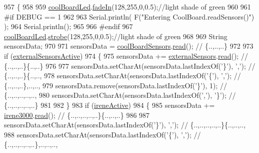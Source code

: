 \begin{DoxyCode}
957 \{
958 
959     \hyperlink{classCoolBoard_a1b1d3c684a5baa56b08486e192fd8e97}{coolBoardLed}.\hyperlink{classCoolBoardLed_ab778f5e7bed0ab74e3906d82110493c3}{fadeIn}(128,255,0,0.5);\textcolor{comment}{//light shade of green}
960                 
961 \textcolor{preprocessor}{#if DEBUG == 1}
962 
963     Serial.println( F(\textcolor{stringliteral}{"Entering CoolBoard.readSensors()"}) );
964     Serial.println();
965 
966 \textcolor{preprocessor}{#endif}
967     \hyperlink{classCoolBoard_a1b1d3c684a5baa56b08486e192fd8e97}{coolBoardLed}.\hyperlink{classCoolBoardLed_ad5f0de4c628cbfbf49896042831c64ad}{strobe}(128,255,0,0.5);\textcolor{comment}{//light shade of green}
968 
969     String sensorsData;
970 
971     sensorsData = \hyperlink{classCoolBoard_af102be5288bd7f7a8e59b13f86e26a00}{coolBoardSensors}.\hyperlink{classCoolBoardSensors_a91badb2539d91fda8679f2a597874c48}{read}(); \textcolor{comment}{// \{..,..,..\}}
972     
973     \textcolor{keywordflow}{if} (\hyperlink{classCoolBoard_a638b00b76aeb819ecfd4c10b8cdd7bb7}{externalSensorsActive})
974     \{
975         sensorsData += \hyperlink{classCoolBoard_a09e26264839c65873eb56af476eff6b2}{externalSensors}.\hyperlink{classExternalSensors_a53177b81eca3be89508b5511ddcd00fc}{read}(); \textcolor{comment}{// \{..,..,..\}\{..,..\}}
976 
977         sensorsData.setCharAt(sensorsData.lastIndexOf(\textcolor{charliteral}{'\}'}), \textcolor{charliteral}{','}); \textcolor{comment}{// \{..,..,..\}\{..,..,}
978         sensorsData.setCharAt(sensorsData.lastIndexOf(\textcolor{charliteral}{'\{'}), \textcolor{charliteral}{','}); \textcolor{comment}{// \{..,..,..\},..,..,}
979         sensorsData.remove(sensorsData.lastIndexOf(\textcolor{charliteral}{'\}'}), 1); \textcolor{comment}{// \{..,..,..,..,..,}
980         sensorsData.setCharAt(sensorsData.lastIndexOf(\textcolor{charliteral}{','}), \textcolor{charliteral}{'\}'}); \textcolor{comment}{// \{..,..,..,..,..\}}
981 
982     \}
983     \textcolor{keywordflow}{if} (\hyperlink{classCoolBoard_a9c3f7ac625481ee2ae802a25d97a4ae0}{ireneActive})
984     \{
985         sensorsData += \hyperlink{classCoolBoard_ad103718ce316006c4695b8eb312eaf11}{irene3000}.\hyperlink{classIrene3000_a852a170feea994ea1df01c6b245b5d9a}{read}(); \textcolor{comment}{// \{..,..,..,..,..\}\{..,..,..\}}
986 
987         sensorsData.setCharAt(sensorsData.lastIndexOf(\textcolor{charliteral}{'\}'}), \textcolor{charliteral}{','}); \textcolor{comment}{// \{..,..,..,..,..\}\{..,..,..,}
988         sensorsData.setCharAt(sensorsData.lastIndexOf(\textcolor{charliteral}{'\{'}), \textcolor{charliteral}{','}); \textcolor{comment}{// \{..,..,..,..,..\},..,..,..,}

\end{DoxyCode}
